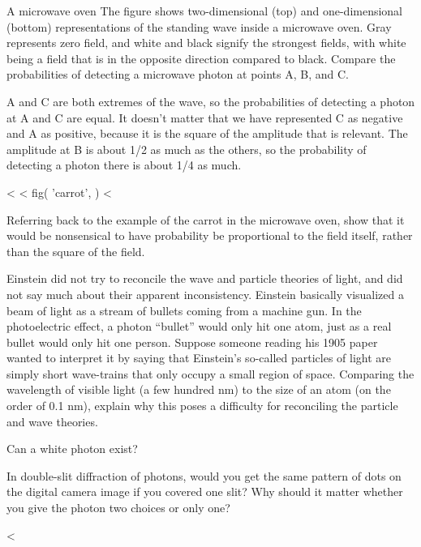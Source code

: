 \begin{eg}{A microwave oven}\label{eg:carrot}
\egquestion The figure shows two-dimensional (top) and
one-dimensional (bottom) representations of the standing
wave inside a microwave oven. Gray represents zero field,
and white and black signify the strongest fields, with white
being a field that is in the opposite direction compared to
black. Compare the probabilities of detecting a microwave
photon at points A, B, and C.

\eganswer A and C are both extremes of the wave, so the
probabilities of detecting a photon at A and C are equal.
It doesn't matter that we have represented C as negative
and A as positive, because it is the square of the amplitude
that is relevant. The amplitude at B is about 1/2 as much
as the others, so the probability of detecting a photon
there is about 1/4 as much.
\end{eg}

<%
<%
  fig(
    'carrot',
  )
<%

\startdqs

\begin{dq}
Referring back to the example of the carrot in the
microwave oven, show that it would be nonsensical to have
probability be proportional to the field itself, rather than
the square of the field.
\end{dq}

\begin{dq}
Einstein did not try to reconcile the wave and particle
theories of light, and did not say much about their apparent
inconsistency. Einstein basically visualized a beam of light
as a stream of bullets coming from a machine gun. In the
photoelectric effect, a photon ``bullet'' would only hit one
atom, just as a real bullet would only hit one person.
Suppose someone reading his 1905 paper wanted to interpret
it by saying that Einstein's so-called particles of light
are simply short wave-trains that only occupy a small
region of space.  Comparing the wavelength of visible light
(a few hundred nm) to the size of an atom (on the order of
0.1 nm), explain why this poses a difficulty for reconciling
the particle and wave theories.
\end{dq}

\begin{dq}
Can a white photon exist?
\end{dq}

\begin{dq}\label{dq:cover-one-slit}
In double-slit diffraction of photons, would you get the
same pattern of dots on the digital camera image if you
covered one slit? Why should it matter whether you give the
photon two choices or only one?
\end{dq}

<%
